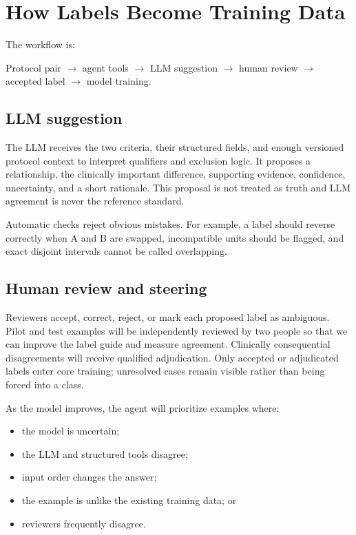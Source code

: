 \documentclass[11pt]{article}
\begin{document}
\section{How Labels Become Training Data}

The workflow is:

\begin{center}
Protocol pair
$\rightarrow$ agent tools
$\rightarrow$ LLM suggestion
$\rightarrow$ human review
$\rightarrow$ accepted label
$\rightarrow$ model training.
\end{center}

\subsection{LLM suggestion}

The LLM receives the two criteria, their structured fields, and enough versioned protocol context to interpret qualifiers and exclusion logic. It proposes a relationship, the clinically important difference, supporting evidence, confidence, uncertainty, and a short rationale. This proposal is not treated as truth and LLM agreement is never the reference standard.

Automatic checks reject obvious mistakes. For example, a label should reverse correctly when A and B are swapped, incompatible units should be flagged, and exact disjoint intervals cannot be called overlapping.

\subsection{Human review and steering}

Reviewers accept, correct, reject, or mark each proposed label as ambiguous. Pilot and test examples will be independently reviewed by two people so that we can improve the label guide and measure agreement. Clinically consequential disagreements will receive qualified adjudication. Only accepted or adjudicated labels enter core training; unresolved cases remain visible rather than being forced into a class.

As the model improves, the agent will prioritize examples where:

\begin{itemize}
    \item the model is uncertain;
    \item the LLM and structured tools disagree;
    \item input order changes the answer;
    \item the example is unlike the existing training data; or
    \item reviewers frequently disagree.
\end{itemize}
\end{document}
